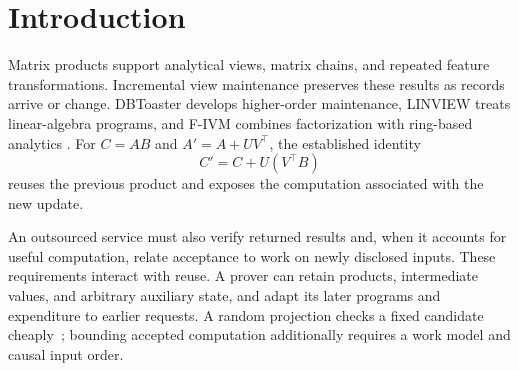 \begin{abstract}
Incremental matrix maintenance reuses previous products, but retained
state also changes the fresh computation needed to obtain acceptance
from an outsourced service. We study finite-field updates with arbitrary
paid history and homogeneous bilinear programs fixed before fresh
factors are disclosed. An output-space argument conditioned on the
factor's rank yields an explicit agreement profile in the online gate
budget. It strictly improves the corresponding uncapped range bound
at every positive budget below $nr$. A resource recursion composes
acceptance bounds under adaptive pathwise budgets, including incorrectly
accepted intermediate states. Conditional linear escape extends the
threshold guarantee to nonuniform inputs. Balancing minimizes both
homogeneous bounds; an exact allocation algorithm handles heterogeneous
rounds. A $2\times2$ six-product Strassen witness attains the single-round
bound over every finite field. Exact-field implementations measure the
full pipeline, including candidate materialization and checks. Dense
updates and Covertype views exercise structured reuse, while randomized
categorical reports instantiate the nonuniform guarantee. The resulting
profiles connect encodings, checking decisions, and a specified work
target, and the measurements expose the practical boundary between cached
state, fresh computation, and verification.
\end{abstract}

\section{Introduction}\label{sec:introduction}
Matrix products support analytical views, matrix chains, and repeated
feature transformations. Incremental view maintenance preserves these
results as records arrive or change. DBToaster develops higher-order
maintenance, LINVIEW treats linear-algebra programs, and F-IVM combines
factorization with ring-based analytics
\cite{dbtoaster,Linview2014,fivm}. For $C=AB$ and
$A'=A+UV^\top$, the established identity
\[
 C'=C+U(V^\top B)
\]
reuses the previous product and exposes the computation associated with
the new update.

An outsourced service must also verify returned results and, when it
accounts for useful computation, relate acceptance to work on newly
disclosed inputs. These requirements interact with reuse. A prover can
retain products, intermediate values, and arbitrary auxiliary state, and
adapt its later programs and expenditure to earlier requests. A random
projection checks a fixed candidate cheaply~\cite{freivalds}; bounding
accepted computation additionally requires a work model and causal input
order.

